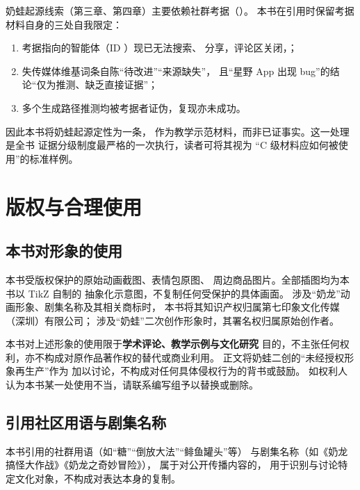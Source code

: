 奶蛙起源线索（第三章、第四章）主要依赖社群考据（）。
本书在引用时保留考据材料自身的三处自我限定：

\begin{enumerate}[label=\arabic*.]
  \item 考据指向的智能体（ID ）现已无法搜索、
        分享，评论区关闭，；
  \item 失传媒体维基词条自陈“待改进”“来源缺失”，
        且“星野 App 出现 bug”的结论“仅为推测、缺乏直接证据”；
  \item 多个生成路径推测均被考据者证伪，复现亦未成功。
\end{enumerate}

因此本书将奶蛙起源定性为一条，
作为教学示范材料，而非已证事实。这一处理是全书
证据分级制度最严格的一次执行，读者可将其视为
“C 级材料应如何被使用”的标准样例。

\section{版权与合理使用}\label{app:sources:copyright}

\subsection{本书对形象的使用}

本书受版权保护的原始动画截图、表情包原图、
周边商品图片。全部插图均为本书以 TikZ 自制的
抽象化示意图，不复制任何受保护的具体画面。
涉及“奶龙”动画形象、剧集名称及其相关商标时，
本书将其知识产权归属第七印象文化传媒（深圳）有限公司；
涉及“奶蛙”二次创作形象时，其署名权归属原始创作者。

\begin{nlcritique}[权利边界]
  本书对上述形象的使用限于\textbf{学术评论、教学示例与文化研究}
  目的，不主张任何权利，亦不构成对原作品著作权的替代或商业利用。
  正文将奶蛙二创的“未经授权形象再生产”作为
  加以讨论，不构成对任何具体侵权行为的背书或鼓励。
  如权利人认为本书某一处使用不当，请联系编写组予以替换或删除。
\end{nlcritique}

\subsection{引用社区用语与剧集名称}

本书引用的社群用语（如“糖”“倒放大法”“鲱鱼罐头”等）
与剧集名称（如《奶龙搞怪大作战》《奶龙之奇妙冒险》），
属于对公开传播内容的，
用于识别与讨论特定文化对象，不构成对表达本身的复制。

